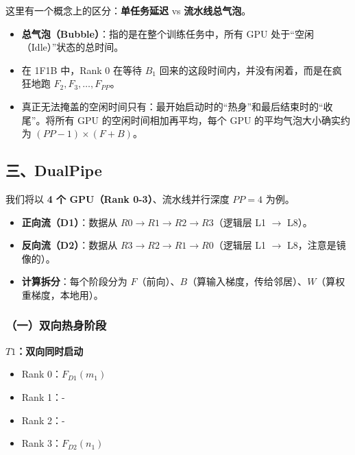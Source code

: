 这里有一个概念上的区分：\textbf{单任务延迟} vs \textbf{流水线总气泡}。

\begin{itemize}
\tightlist
\item
  \textbf{总气泡（Bubble）}：指的是在整个训练任务中，所有 GPU 处于``空闲（Idle）''状态的总时间。
\item
  在 1F1B 中，Rank 0 在等待 \(B_1\) 回来的这段时间内，并没有闲着，而是在疯狂地跑 \(F_2, F_3, \dots, F_{PP}\)。
\item
  真正无法掩盖的空闲时间只有：最开始启动时的``热身''和最后结束时的``收尾''。将所有 GPU 的空闲时间相加再平均，每个 GPU 的平均气泡大小确实约为 \((PP - 1) \times (F + B)\)。
\end{itemize}

\hypertarget{ux4e09dualpipe}{%
\subsection{三、DualPipe}\label{ux4e09dualpipe}}

我们将以 \textbf{4 个 GPU（Rank 0-3）}、流水线并行深度 \(PP = 4\) 为例。

\begin{itemize}
\tightlist
\item
  \textbf{正向流（D1）}：数据从 \(R0 \to R1 \to R2 \to R3\)（逻辑层 L1 \(\to\) L8）。
\item
  \textbf{反向流（D2）}：数据从 \(R3 \to R2 \to R1 \to R0\)（逻辑层 L1 \(\to\) L8，注意是镜像的）。
\item
  \textbf{计算拆分}：每个阶段分为 \(F\)（前向）、\(B\)（算输入梯度，传给邻居）、\(W\)（算权重梯度，本地用）。
\end{itemize}

\hypertarget{ux4e00ux53ccux5411ux70edux8eabux9636ux6bb5}{%
\subsubsection{（一）双向热身阶段}\label{ux4e00ux53ccux5411ux70edux8eabux9636ux6bb5}}

\textbf{\(T1\)：双向同时启动}

\begin{itemize}
\tightlist
\item
  Rank 0：\(F_{D1}(m_1)\)
\item
  Rank 1：-
\item
  Rank 2：-
\item
  Rank 3：\(F_{D2}(n_1)\)
\end{itemize}

